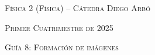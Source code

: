 \documentclass[11pt,spanish]{article}
\begin{document}
    \begin{center}
    \textsc{\large Física 2 (Física) -- Cátedra Diego Arbó}
    \par\end{center}{\large \par}
    
    \begin{center}
    \textsc{\large Primer Cuatrimestre de 2025}
    \par\end{center}{\large \par}
    
    \begin{center}
    \textsc{\large Guía 8: Formación de imágenes}
    \par\end{center}{\large \par}
\end{document}

